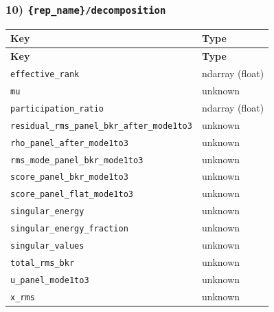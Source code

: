 \documentclass[11pt]{article}
\begin{document}
\subsubsection*{10) \texttt{\{rep\_\allowbreak{}name\}/\allowbreak{}decomposition}}
\begin{longtable}{|p{}|p{}|}
\hline
\textbf{Key} & \textbf{Type} \\ \hline
\endfirsthead
\hline
\textbf{Key} & \textbf{Type} \\ \hline
\endhead
\texttt{effective\_\allowbreak{}rank} & ndarray (float) \\ \hline
\texttt{mu} & unknown \\ \hline
\texttt{participation\_\allowbreak{}ratio} & ndarray (float) \\ \hline
\texttt{residual\_\allowbreak{}rms\_\allowbreak{}panel\_\allowbreak{}bkr\_\allowbreak{}after\_\allowbreak{}mode1to3} & unknown \\ \hline
\texttt{rho\_\allowbreak{}panel\_\allowbreak{}after\_\allowbreak{}mode1to3} & unknown \\ \hline
\texttt{rms\_\allowbreak{}mode\_\allowbreak{}panel\_\allowbreak{}bkr\_\allowbreak{}mode1to3} & unknown \\ \hline
\texttt{score\_\allowbreak{}panel\_\allowbreak{}bkr\_\allowbreak{}mode1to3} & unknown \\ \hline
\texttt{score\_\allowbreak{}panel\_\allowbreak{}flat\_\allowbreak{}mode1to3} & unknown \\ \hline
\texttt{singular\_\allowbreak{}energy} & unknown \\ \hline
\texttt{singular\_\allowbreak{}energy\_\allowbreak{}fraction} & unknown \\ \hline
\texttt{singular\_\allowbreak{}values} & unknown \\ \hline
\texttt{total\_\allowbreak{}rms\_\allowbreak{}bkr} & unknown \\ \hline
\texttt{u\_\allowbreak{}panel\_\allowbreak{}mode1to3} & unknown \\ \hline
\texttt{x\_\allowbreak{}rms} & unknown \\ \hline
\end{longtable}
\end{document}
